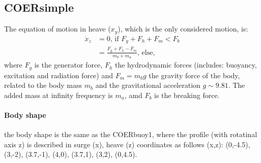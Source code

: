 \documentclass[oneside,10pt,a4paper]{book}
\begin{document}
\subsection{COERsimple}
The equation of motion in heave ($x_y$), which is the only considered motion, is:
\begin{align}\label{eq:COERsimple}
\ddot{x}_z&=0\text{, if }F_g+F_h+F_m<F_b \\
	&=\frac{F_g+F_h-F_m}{m_b+m_a}\text{, else,} 
\end{align}
where $F_g$ is the generator force, $F_h$ the hydrodynamic forces (includes: buoyancy, excitation and radiation force) and $F_m=m_b g$ the gravity force of the body, related to the body mass $m_b$ and the gravitational acceleration $g\sim9.81$. The added mass at infinity frequency is $m_a$, amd $F_b$ is the breaking force.
\paragraph{Body shape}
the body shape is the same as the COERbuoy1, where the profile (with rotatinal axis z) is described in surge (x), heave (z) coordinates as follows (x,z): (0,-4.5), (3,-2), (3.7,-1), (4,0), (3.7,1), (3,2), (0,4.5).
 
 
\end{document}
